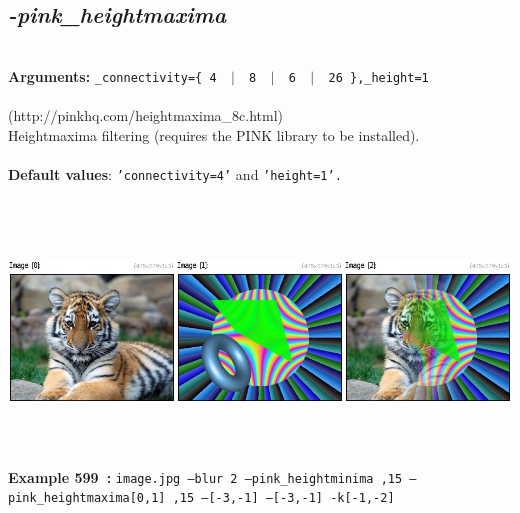 \documentclass[a4paper,11pt,twoside]{book}
\begin{document}
\subsection{\emph{-pink\_heightmaxima} }\vspace*{-0.5em}
~\\\textbf{Arguments: } 
{\small \texttt{\_connectivity=\{ 4 ~$|$~ 8 ~$|$~ 6 ~$|$~ 26 \},\_height=1}}\\~\\
(http://pinkhq.com/heightmaxima\_8c.html)
~\\Heightmaxima filtering (requires the PINK library to be installed).
~\\~\\\textbf{Default values}: {\small \texttt{'connectivity=4'} and \texttt{'height=1'.}}
\begin{center}\includegraphics[keepaspectratio=true,height=7cm,width=\textwidth]{img/gmic_def599.jpg}\\
{\footnotesize \textbf{Example 599~:} \texttt{image.jpg --blur 2 --pink\_heightminima ,15 --pink\_heightmaxima[0,1] ,15 --[-3,-1] --[-3,-1] -k[-1,-2]}}
\end{center}
\end{document}
